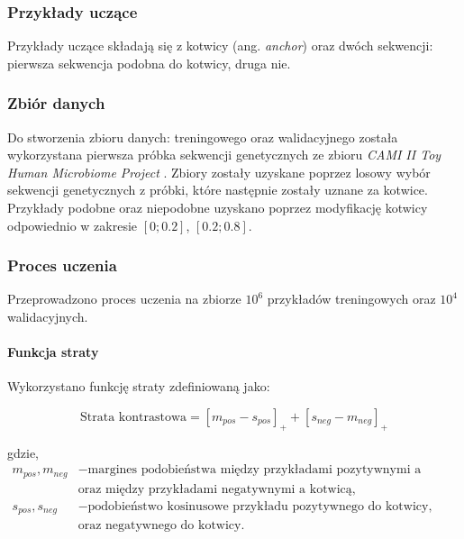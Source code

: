                 \subsubsection{Przykłady uczące}
                    Przykłady uczące składają się z kotwicy (ang. \textit{anchor}) oraz dwóch sekwencji: pierwsza sekwencja podobna do kotwicy, druga nie.
    
                \subsubsection{Zbiór danych}
                    Do stworzenia zbioru danych: treningowego oraz walidacyjnego została wykorzystana pierwsza próbka sekwencji genetycznych ze zbioru \textit{CAMI II Toy Human Microbiome Project} \cite{Fritz2019}. Zbiory zostały uzyskane poprzez losowy wybór sekwencji genetycznych z próbki, które następnie zostały uznane za kotwice. Przykłady podobne oraz niepodobne uzyskano poprzez modyfikację kotwicy odpowiednio w zakresie $[0; 0.2]$, $[0.2; 0.8]$.
    
                \subsubsection{Proces uczenia}
    
                    Przeprowadzono proces uczenia na zbiorze $10^{6}$ przykładów treningowych oraz $10^{4}$ walidacyjnych.
    
                    \paragraph{Funkcja straty}
    
                        Wykorzystano funkcję straty zdefiniowaną jako:
                        
                        \begin{equation}
                            \text{Strata kontrastowa} = [m_{pos} - s_{pos}]_{+} + [s_{neg} - m_{neg}]_{+}
                        \end{equation}
    
                        gdzie,
                        \begin{align*}
                            m_{pos}, m_{neg} &- \text{margines podobieństwa między przykładami pozytywnymi a kotwicą,} \\
                            &\text{oraz między przykładami negatywnymi a kotwicą}, \\
                            s_{pos}, s_{neg} &- \text{podobieństwo kosinusowe przykładu pozytywnego do kotwicy,} \\
                            &\text{oraz negatywnego do kotwicy.}
                        \end{align*}
    
